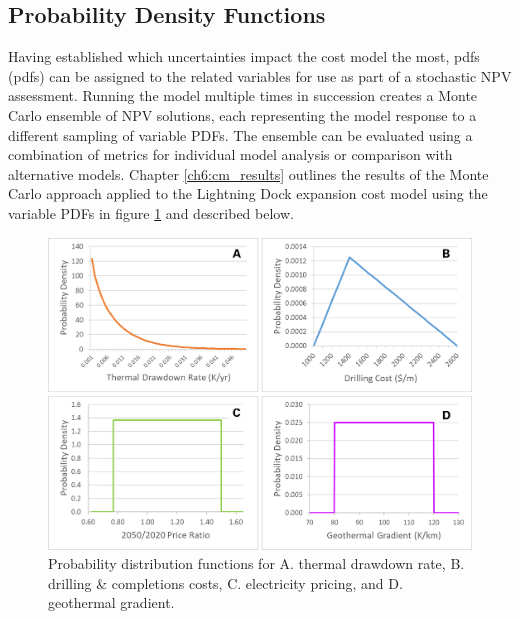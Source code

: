\subsection{Probability Density Functions}\label{ch4:pdfs}
Having established which uncertainties impact the cost model the most, \acrlong{pdf}s (\acrshort{pdf}s) can be assigned to the related variables for use as part of a stochastic NPV assessment. Running the model multiple times in succession creates a Monte Carlo ensemble of NPV solutions, each representing the model response to a different sampling of variable PDFs. The ensemble can be evaluated using a combination of metrics for individual model analysis or comparison with alternative models. Chapter \ref{ch6:cm_results} outlines the results of the Monte Carlo approach applied to the Lightning Dock expansion cost model using the variable PDFs in figure \ref{fig:cm_probdists} and described below.

\begin{figure}[htp]
\centering
\includegraphics[width=.85\textwidth]{templates/images/Figure-ProbDists.png}
\singlespacing
\caption[Cost model probability distributions]{Probability distribution functions for A. thermal drawdown rate, B. drilling \& completions costs, C. electricity pricing, and D. geothermal gradient.}
\label{fig:cm_probdists}
\end{figure}

